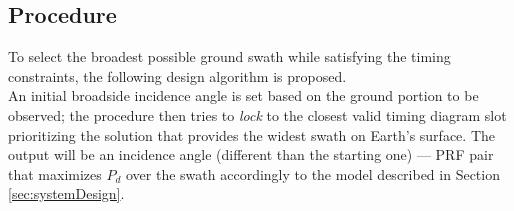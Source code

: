 \documentclass[conference,a4paper]{IEEEtran}
\begin{document}
    \subsection{Procedure}
    \label{subsec:procedure}
    To select the broadest possible ground swath while satisfying the timing constraints, the following design algorithm is proposed.\\
    An initial broadside incidence angle is set based on the ground portion to be observed;
    the procedure then tries to \emph{lock} to the closest valid timing diagram slot prioritizing the solution that provides the widest swath on Earth's surface.
    The output will be an incidence angle (different than the starting one) --- PRF pair that maximizes $P_d$ over the swath accordingly to the model described in Section \ref{sec:systemDesign}.
\end{document}
